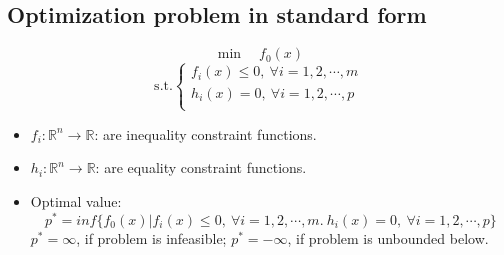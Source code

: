 \subsection{Optimization problem in standard form}
$$
\min \quad f_0(x)
$$
$$
\text{s.t.} 
\begin{cases}
    f_i(x) \le 0, \ \forall i = 1, 2, \cdots, m \\
    h_i(x) = 0, \ \forall i = 1, 2, \cdots, p \\
\end{cases}
$$
\begin{itemize}
    \item $f_i: \mathbb{R}^n \rightarrow \mathbb{R}$: are inequality constraint functions.
    \item $h_i: \mathbb{R}^n \rightarrow \mathbb{R}$: are equality constraint functions.
    \item Optimal value: 
    $$
    p^* = inf\{f_0(x) | f_i(x) \le 0, \ \forall i = 1, 2, \cdots, m. \ h_i(x) = 0, \ \forall i = 1, 2, \cdots, p\}
    $$
    $p^* = \infty$, if problem is infeasible; $p^* = - \infty$, if problem is unbounded below.
\end{itemize}

